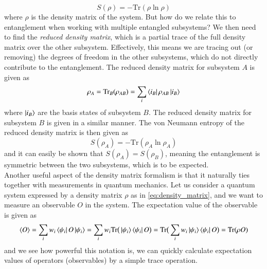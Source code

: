 \documentclass{subfiles}
\begin{document}
\begin{equation}
    S(\rho) = -\text{Tr}(\rho \ln \rho)
\end{equation}
where $\rho$ is the density matrix of the system. But how do we relate this to entanglement when working with multiple entangled subsystems? We then need to find the \emph{reduced density matrix}, which is a partial trace of the full density matrix over the other subsystem. Effectively, this means we are tracing out (or removing) the degrees of freedom in the other subsystems, which do not directly contribute to the entanglement. The reduced density matrix for subsystem $A$ is given as
\begin{equation}
    \rho_A = \text{Tr}_B(\rho_{AB}) = \sum_{i}\bra{i_B}\rho_{AB}\ket{i_B}
\end{equation}
where $\ket{i_B}$ are the basis states of subsystem $B$. The reduced density matrix for subsystem $B$ is given in a similar manner. The von Neumann entropy of the reduced density matrix is then given as
\begin{equation}
    S(\rho_A) = -\text{Tr}(\rho_A \ln \rho_A)
\end{equation}
and it can easily be shown that $S(\rho_A) = S(\rho_B)$, meaning the entanglement is symmetric between the two subsystems, which is to be expected. 
\\

Another useful aspect of the density matrix formalism is that it naturally ties together with measurements in quantum mechanics. Let us consider a quantum system expressed by a density matrix $\rho$ as in \eqref{eq:density_matrix}, and we want to measure an observable $O$ in the system. The expectation value of the observable is given as
\begin{align*}
    \braket{O} = \sum_i w_i\bra{\psi_i}O\ket{\psi_i} = \sum_i w_i\text{Tr}\big(\ket{\psi_i}\bra{\psi_i}O\big) = \text{Tr}\big(\sum_i w_i \ket{\psi_i}\bra{\psi_i}O\big) = \text{Tr}(\rho O)
\end{align*}
and we see how powerful this notation is, we can quickly calculate expectation values of operators (observables) by a simple trace operation. 
\end{document}
